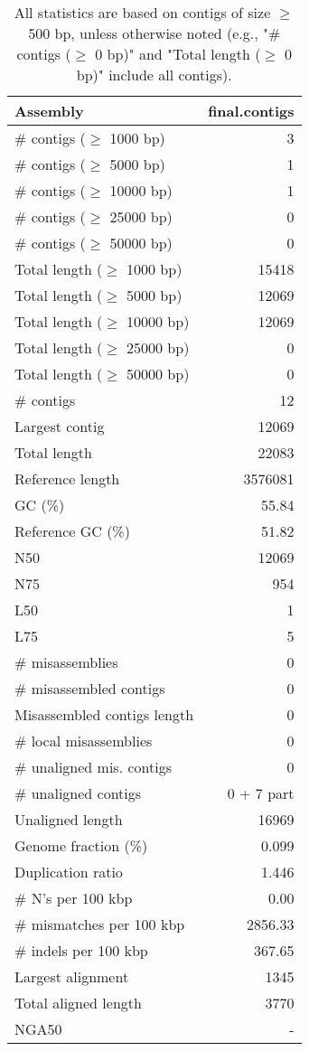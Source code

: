 \documentclass[12pt,a4paper]{article}
\begin{document}
\begin{table}[ht]
\begin{center}
\caption{All statistics are based on contigs of size $\geq$ 500 bp, unless otherwise noted (e.g., "\# contigs ($\geq$ 0 bp)" and "Total length ($\geq$ 0 bp)" include all contigs).}
\begin{tabular}{|l*{1}{|r}|}
\hline
Assembly & final.contigs \\ \hline
\# contigs ($\geq$ 1000 bp) & 3 \\ \hline
\# contigs ($\geq$ 5000 bp) & 1 \\ \hline
\# contigs ($\geq$ 10000 bp) & 1 \\ \hline
\# contigs ($\geq$ 25000 bp) & 0 \\ \hline
\# contigs ($\geq$ 50000 bp) & 0 \\ \hline
Total length ($\geq$ 1000 bp) & 15418 \\ \hline
Total length ($\geq$ 5000 bp) & 12069 \\ \hline
Total length ($\geq$ 10000 bp) & 12069 \\ \hline
Total length ($\geq$ 25000 bp) & 0 \\ \hline
Total length ($\geq$ 50000 bp) & 0 \\ \hline
\# contigs & 12 \\ \hline
Largest contig & 12069 \\ \hline
Total length & 22083 \\ \hline
Reference length & 3576081 \\ \hline
GC (\%) & 55.84 \\ \hline
Reference GC (\%) & 51.82 \\ \hline
N50 & 12069 \\ \hline
N75 & 954 \\ \hline
L50 & 1 \\ \hline
L75 & 5 \\ \hline
\# misassemblies & 0 \\ \hline
\# misassembled contigs & 0 \\ \hline
Misassembled contigs length & 0 \\ \hline
\# local misassemblies & 0 \\ \hline
\# unaligned mis. contigs & 0 \\ \hline
\# unaligned contigs & 0 + 7 part \\ \hline
Unaligned length & 16969 \\ \hline
Genome fraction (\%) & 0.099 \\ \hline
Duplication ratio & 1.446 \\ \hline
\# N's per 100 kbp & 0.00 \\ \hline
\# mismatches per 100 kbp & 2856.33 \\ \hline
\# indels per 100 kbp & 367.65 \\ \hline
Largest alignment & 1345 \\ \hline
Total aligned length & 3770 \\ \hline
NGA50 & - \\ \hline
\end{tabular}
\end{center}
\end{table}
\end{document}

